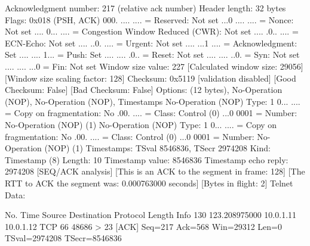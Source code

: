     Acknowledgment number: 217    (relative ack number)
    Header length: 32 bytes
    Flags: 0x018 (PSH, ACK)
        000. .... .... = Reserved: Not set
        ...0 .... .... = Nonce: Not set
        .... 0... .... = Congestion Window Reduced (CWR): Not set
        .... .0.. .... = ECN-Echo: Not set
        .... ..0. .... = Urgent: Not set
        .... ...1 .... = Acknowledgment: Set
        .... .... 1... = Push: Set
        .... .... .0.. = Reset: Not set
        .... .... ..0. = Syn: Not set
        .... .... ...0 = Fin: Not set
    Window size value: 227
    [Calculated window size: 29056]
    [Window size scaling factor: 128]
    Checksum: 0x5119 [validation disabled]
        [Good Checksum: False]
        [Bad Checksum: False]
    Options: (12 bytes), No-Operation (NOP), No-Operation (NOP), Timestamps
        No-Operation (NOP)
            Type: 1
                0... .... = Copy on fragmentation: No
                .00. .... = Class: Control (0)
                ...0 0001 = Number: No-Operation (NOP) (1)
        No-Operation (NOP)
            Type: 1
                0... .... = Copy on fragmentation: No
                .00. .... = Class: Control (0)
                ...0 0001 = Number: No-Operation (NOP) (1)
        Timestamps: TSval 8546836, TSecr 2974208
            Kind: Timestamp (8)
            Length: 10
            Timestamp value: 8546836
            Timestamp echo reply: 2974208
    [SEQ/ACK analysis]
        [This is an ACK to the segment in frame: 128]
        [The RTT to ACK the segment was: 0.000763000 seconds]
        [Bytes in flight: 2]
Telnet
    Data: 

No.     Time           Source                Destination           Protocol Length Info
    130 123.208975000  10.0.1.11             10.0.1.12             TCP      66     48686 > 23 [ACK] Seq=217 Ack=568 Win=29312 Len=0 TSval=2974208 TSecr=8546836

